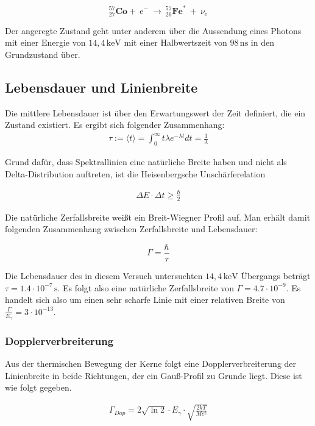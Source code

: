 \[ ^{57}_{27}\mathrm{\textbf{Co}} +\ \mathrm{e}^-\ \longrightarrow\ ^{57}_{26}\mathrm{\textbf{Fe}}^*\ +\ \nu_e\]


Der angeregte Zustand geht unter anderem über die Aussendung eines Photons mit einer Energie von $14,4\,\mathrm{keV}$ mit einer Halbwertszeit von $98\,\mathrm{ns}$ in den Grundzustand über.

\subsection{Lebensdauer und Linienbreite}

Die mittlere Lebensdauer ist über den Erwartungswert der Zeit definiert, die ein Zustand existiert. Es ergibt sich folgender Zusammenhang:
\begin{align}
\tau:=\langle t\rangle=\int_{0}^{\infty}t\lambda e^{-\lambda t}dt=\frac{1}{\lambda} 
\end{align}

Grund dafür, dass Spektrallinien eine natürliche Breite haben und nicht als Delta-Distribution auftreten, ist die Heisenbergsche Unschärferelation

\begin{align}
\Delta E\cdot\Delta t\geq\frac{\hbar}{2}
\end{align}


Die natürliche Zerfallsbreite weißt ein Breit-Wiegner Profil auf. Man erhält damit folgenden Zusammenhang zwischen Zerfallsbreite und Lebensdauer:

\[\Gamma=\frac{\hbar}{\tau}\]


Die Lebensdauer des in diesem Versuch untersuchten $14,4\,\mathrm{keV}$ Übergangs beträgt  $\tau = 1.4\cdot 10^{-7}\,\mathrm{s}$. Es folgt also eine natürliche Zerfallsbreite von $\Gamma = 4.7\cdot 10^{-9}$. Es handelt sich also um einen sehr scharfe Linie mit einer relativen Breite von $\frac{\Gamma}{E_{\gamma}}=3\cdot 10^{-13}$.


\subsubsection{Dopplerverbreiterung}

Aus der thermischen Bewegung der Kerne folgt eine Dopplerverbreiterung der Linienbreite in beide Richtungen, der ein Gauß-Profil zu Grunde liegt. Diese ist wie folgt gegeben.

\begin{align}
\Gamma_{Dop} = 2\sqrt{\ln2}\cdot E_{\gamma}\cdot\sqrt{\frac{2kT}{Mc^2}}
\end{align}



